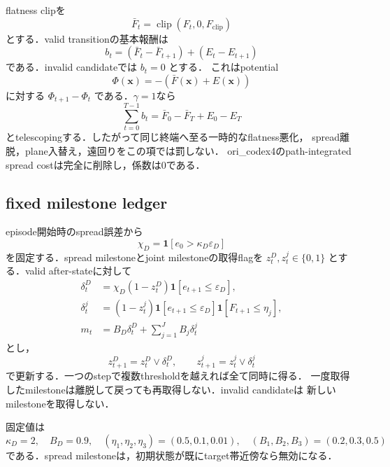 \documentclass[a4paper,11pt]{ltjsarticle}
\newcommand{\clip}{\operatorname{clip}}
\newcommand{\Ind}{\mathbf{1}}
\begin{document}
flatness clipを
\begin{equation}
 \bar F_t=\clip(F_t,0,F_{\mathrm{clip}})
\end{equation}
とする．valid transitionの基本報酬は
\begin{equation}
 b_t=(\bar F_t-\bar F_{t+1})+(E_t-E_{t+1})
 \label{eq:base-reward}
\end{equation}
である．invalid candidateでは $b_t=0$ とする．
これはpotential
\begin{equation}
 \Phi(\bm x)=-(\bar F(\bm x)+E(\bm x))
\end{equation}
に対する $\Phi_{t+1}-\Phi_t$ である．$\gamma=1$なら
\begin{equation}
 \sum_{t=0}^{T-1}b_t
 =\bar F_0-\bar F_T+E_0-E_T
 \label{eq:telescope}
\end{equation}
とtelescopingする．したがって同じ終端へ至る一時的なflatness悪化，
spread離脱，plane入替え，遠回りをこの項では罰しない．
ori\_codex4のpath-integrated spread costは完全に削除し，係数は0である．

\subsection{fixed milestone ledger}

episode開始時のspread誤差から
\begin{equation}
 \chi_D=\Ind[e_0>\kappa_D\varepsilon_D]
\end{equation}
を固定する．spread milestoneとjoint milestoneの取得flagを
$z_t^D,z_t^j\in\{0,1\}$ とする．valid after-stateに対して
\begin{align}
 \delta_t^D
 &=\chi_D(1-z_t^D)\Ind[e_{t+1}\le\varepsilon_D],\\
 \delta_t^j
 &=(1-z_t^j)
   \Ind[e_{t+1}\le\varepsilon_D]
   \Ind[F_{t+1}\le\eta_j],\\
 m_t
 &=B_D\delta_t^D+\sum_{j=1}^{J}B_j\delta_t^j
 \label{eq:milestone}
\end{align}
とし，
\begin{equation}
 z_{t+1}^D=z_t^D\lor\delta_t^D,\qquad
 z_{t+1}^j=z_t^j\lor\delta_t^j
\end{equation}
で更新する．一つのstepで複数thresholdを越えれば全て同時に得る．
一度取得したmilestoneは離脱して戻っても再取得しない．invalid candidateは
新しいmilestoneを取得しない．

固定値は
\begin{equation}
 \kappa_D=2,\quad B_D=0.9,\quad
 (\eta_1,\eta_2,\eta_3)=(0.5,0.1,0.01),\quad
 (B_1,B_2,B_3)=(0.2,0.3,0.5)
 \label{eq:milestone-values}
\end{equation}
である．spread milestoneは，初期状態が既にtarget帯近傍なら無効になる．
\end{document}
